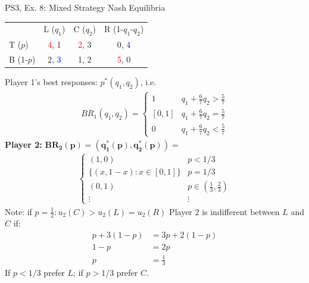 \begin{frame}{PS3, Ex. 8: Mixed Strategy Nash Equilibria}
  \begin{multicols}{2}
    \begin{table}
      \begin{tabular}{l|c|c|c|}
          \multicolumn{1}{c}{}  & \multicolumn{1}{c}{L ($q_1$)} & \multicolumn{1}{c}{C ($q_2$)} & \multicolumn{1}{c}{R (1-$q_1$-$q_2$)} \\\cline{2-4}
          T ($p$)   & \textcolor{red}{4}, 1 & \textcolor{red}{2}, 3 & 0, \textcolor{blue}{4} \\\cline{2-4}
          B (1-$p$) & 2, \textcolor{blue}{3} & 1, 2 & \textcolor{red}{5}, 0 \\\cline{2-4}
      \end{tabular}
    \end{table}
    Player 1's best responses: $p^{*}(q_1,q_2)$, i.e.
    \begin{align*}
      BR_1(q_1,q_2)=
      \left\{ \begin{array}{ll}
          1                 & q_1 + \frac{6}{7}q_2 > \frac{5}{7}\\
          \left[0,1\right]  & q_1 + \frac{6}{7}q_2 = \frac{5}{7}\\
          0                 & q_1 + \frac{6}{7}q_2 < \frac{5}{7}
      \end{array}\right.
    \end{align*}
    \textbf{Player 2:} $\bm{BR_2(p)=\left(q_1^{*}(p),q_2^{*}(p)\right)}=$
    \begin{align*}
      \left\{ \begin{array}{ll}
          (1,0)                 & p < 1/3 \\
          \{(x,1-x):x\in[0,1]\} & p = 1/3 \\
          (0,1)                 & p\in\left(\frac{1}{3},\frac{2}{3}\right)\\
          \vdots                & \vdots
      \end{array}\right.
    \end{align*}
    Note: if $p=\frac{1}{2}:u_2(C)>u_2(L)=u_2(R)$
  \vfill\null \columnbreak
    Player 2 is indifferent between $L$ and $C$ if:
    \begin{align*}
      p+3(1-p)&= 3p + 2(1-p) \\
      1-p     &= 2p \\
      p       &= \frac{1}{3}
    \end{align*}
    If $p<1/3$ prefer $L$; if $p>1/3$ prefer $C$.\\\medskip

\end{multicols}
\end{frame}
